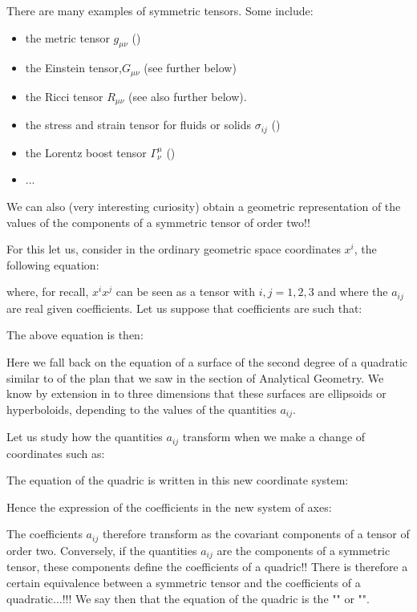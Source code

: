 	There are many examples of symmetric tensors. Some include:
	\begin{itemize}
		\item the metric tensor $g_{\mu \nu }$ () 
		\item the Einstein tensor,$G_{\mu \nu }$ (see further below) 
		\item the Ricci tensor $R_{\mu \nu }$ (see also further below).
		\item the stress and strain tensor for fluids or solids  $\sigma_{ij}$ ()
		\item  the Lorentz boost tensor $\Gamma_\nu^\mu$ () 
		\item ...
	\end{itemize}
	We can also (very interesting curiosity) obtain a geometric representation of the values of the components of a symmetric tensor of order two!! 
	
	For this let us, consider in the ordinary geometric  space coordinates $x^i$, the following equation:
	
	where, for recall, $x^ix^j$ can be seen as a tensor with $i,j=1,2,3$ and where the $a_{ij}$ are real given coefficients. Let us suppose that coefficients are such that:
	
	The above equation is then:
	
	Here we fall back on the equation of a surface of the second degree of a quadratic similar to of the plan that we saw in the section of Analytical Geometry. We know by extension in to three dimensions that these surfaces are ellipsoids or hyperboloids, depending to the values of the quantities $a_{ij}$.
	
	Let us study how the quantities $a_{ij}$ transform  when we make a change of coordinates such as:
	
	The equation of the quadric is written in this new coordinate system:
	
	Hence the expression of the coefficients in the new system of axes:
	
	The coefficients $a_{ij}$ therefore transform as the covariant components of a tensor of order two. Conversely, if the quantities $a_{ij}$ are the components of a symmetric tensor, these components define the coefficients of a quadric!! There is therefore a certain equivalence between a symmetric tensor and the coefficients of a quadratic...!!! We say then that the equation of the quadric is the "" or "".
	
